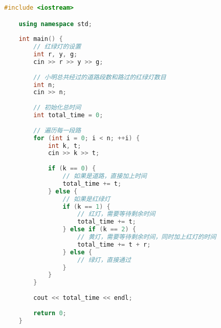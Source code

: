 \begin{lstlisting}[language=C++]
    #include <iostream>

    using namespace std;
    
    int main() {
        // 红绿灯的设置
        int r, y, g;
        cin >> r >> y >> g;
    
        // 小明总共经过的道路段数和路过的红绿灯数目
        int n;
        cin >> n;
    
        // 初始化总时间
        int total_time = 0;
    
        // 遍历每一段路
        for (int i = 0; i < n; ++i) {
            int k, t;
            cin >> k >> t;
    
            if (k == 0) {
                // 如果是道路，直接加上时间
                total_time += t;
            } else {
                // 如果是红绿灯
                if (k == 1) {
                    // 红灯，需要等待剩余时间
                    total_time += t;
                } else if (k == 2) {
                    // 黄灯，需要等待剩余时间，同时加上红灯的时间
                    total_time += t + r;
                } else {
                    // 绿灯，直接通过
                }
            }
        }
    
        cout << total_time << endl;
    
        return 0;
    }    
\end{lstlisting}